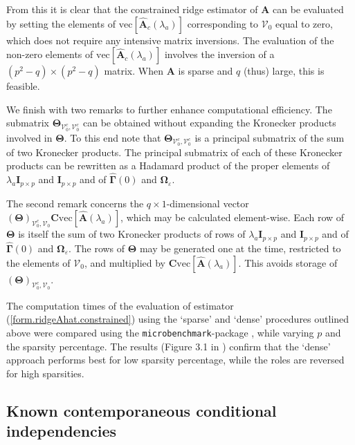 From this it is clear that the constrained ridge estimator of $\mathbf{A}$ can be evaluated by setting the elements of $\mbox{vec}[\hat{\mathbf{A}}_c(\lambda_a)]$ corresponding to $\mathcal{V}_0$ equal to zero, which does not require any intensive matrix inversions. The evaluation of the non-zero elements of $\mbox{vec}[\hat{\mathbf{A}}_c(\lambda_a)]$ involves the inversion of a $(p^2 - q) \times (p^2 - q)$ matrix. When $\mathbf{A}$ is sparse and $q$ (thus) large, this is feasible.

We finish with two remarks to further enhance computational efficiency. The submatrix $\mathbf{\Theta}_{\mathcal{V}_0^c, \mathcal{V}_0^c}$ can be obtained without expanding the Kronecker products involved in $\mathbf{\Theta}$. To this end note that $\mathbf{\Theta}_{\mathcal{V}_0^c, \mathcal{V}_0^c}$ is a principal submatrix of the sum of two Kronecker products. The principal submatrix of each of these Kronecker products can be rewritten as a Hadamard product of the proper elements of $\lambda_a \mathbf{I}_{p \times p}$ and $\mathbf{I}_{p \times p}$ and of $\hat{\mathbf{\Gamma}}(0)$ and $\mathbf{\Omega}_{\varepsilon}$.

The second remark concerns the $q \times 1$-dimensional vector $(\mathbf{\Theta})_{\mathcal{V}_0^c, \mathcal{V}_0} \mathbf{C} \mbox{vec}[ \hat{\mathbf{A}}(\lambda_a) ]$, which may be calculated element-wise. Each row of $\mathbf{\Theta}$ is itself the sum of two Kronecker products of rows of $\lambda_a \mathbf{I}_{p \times p}$ and $\mathbf{I}_{p \times p}$ and of $\hat{\mathbf{\Gamma}}(0)$ and $\mathbf{\Omega}_{\varepsilon}$. The rows of $\mathbf{\Theta}$ may be generated one at the time, restricted to the elements of $\mathcal{V}_0$, and multiplied by $\mathbf{C} \mbox{vec}[ \hat{\mathbf{A}}(\lambda_a)]$. This avoids storage of $(\mathbf{\Theta})_{\mathcal{V}_0^c, \mathcal{V}_0}$.

The computation times of the evaluation of estimator (\ref{form.ridgeAhat.constrained}) using the `sparse' and `dense' procedures outlined above were compared using the {\tt microbenchmark}-package \cite{Mersmann2014}, while varying $p$ and the sparsity percentage. The results (Figure 3.1 in \cite{Supp2018}) confirm that the `dense' approach performs best for low sparsity percentage, while the roles are reversed for high sparsities.

\subsection{Known contemporaneous conditional independencies} \label{sect:ridgeWithContemporaneousSupport}

